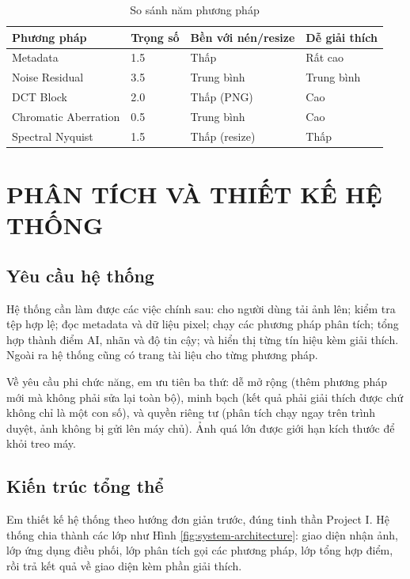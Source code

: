 \documentclass[14pt,a4paper,oneside]{report}
\begin{document}
\begin{table}[H]
\centering
\caption{So sánh năm phương pháp}
\label{tab:method-compare}
\begin{tabularx}{\textwidth}{p{}p{}Y Y}
\toprule
\textbf{Phương pháp} & \textbf{Trọng số} & \textbf{Bền với nén/resize} & \textbf{Dễ giải thích} \\
\midrule
Metadata & 1.5 & Thấp & Rất cao \\
Noise Residual & 3.5 & Trung bình & Trung bình \\
DCT Block & 2.0 & Thấp (PNG) & Cao \\
Chromatic Aberration & 0.5 & Trung bình & Cao \\
Spectral Nyquist & 1.5 & Thấp (resize) & Thấp \\
\bottomrule
\end{tabularx}
\end{table}

\clearpage

\chapter{PHÂN TÍCH VÀ THIẾT KẾ HỆ THỐNG}

\section{Yêu cầu hệ thống}
Hệ thống cần làm được các việc chính sau: cho người dùng tải ảnh lên; kiểm tra tệp hợp lệ; đọc metadata và dữ liệu pixel; chạy các phương pháp phân tích; tổng hợp thành điểm AI, nhãn và độ tin cậy; và hiển thị từng tín hiệu kèm giải thích. Ngoài ra hệ thống cũng có trang tài liệu cho từng phương pháp.

Về yêu cầu phi chức năng, em ưu tiên ba thứ: dễ mở rộng (thêm phương pháp mới mà không phải sửa lại toàn bộ), minh bạch (kết quả phải giải thích được chứ không chỉ là một con số), và quyền riêng tư (phân tích chạy ngay trên trình duyệt, ảnh không bị gửi lên máy chủ). Ảnh quá lớn được giới hạn kích thước để khỏi treo máy.

\section{Kiến trúc tổng thể}
Em thiết kế hệ thống theo hướng đơn giản trước, đúng tinh thần Project I. Hệ thống chia thành các lớp như Hình \ref{fig:system-architecture}: giao diện nhận ảnh, lớp ứng dụng điều phối, lớp phân tích gọi các phương pháp, lớp tổng hợp điểm, rồi trả kết quả về giao diện kèm phần giải thích.
\end{document}
